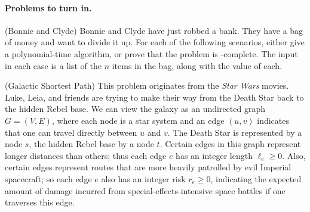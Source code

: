 \paragraph{Problems to turn in.}

\begin{questions}

\question (Bonnie and Clyde) Bonnie and Clyde have just robbed a
  bank. They have a bag of money and want to divide it up. For each of
  the following scenarios, either give a polynomial-time algorithm, or
  prove that the problem is \NP-complete. The input in each case is a
  list of the $n$ items in the bag, along with the value of each.
  \newpage

  \question[15] (Galactic Shortest Path) This problem originates from
  the \emph{Star Wars} movies. Luke, Leia, and friends are trying to
  make their way from the Death Star back to the hidden Rebel base. We
  can view the galaxy as an undirected graph $G = (V, E)$, where each
  node is a star system and an edge $(u, v)$ indicates that one can
  travel directly between $u$ and $v$. The Death Star is represented
  by a node $s$, the hidden Rebel base by a node $t$. Certain edges in
  this graph represent longer distances than others; thus each edge
  $e$ has an integer length $\ell_e\ge 0$. Also, certain edges
  represent routes that are more heavily patrolled by evil Imperial
  spacecraft; so each edge $e$ also has an integer risk $r_e \ge 0$,
  indicating the expected amount of damage incurred from
  special-effects-intensive space battles if one traverses this edge.
  

\end{questions}
